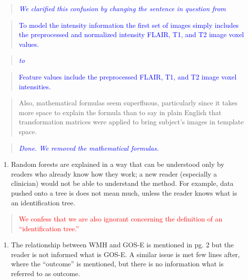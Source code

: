 \documentclass[12pt,]{article}
\providecommand{\tightlist}{%
  \setlength{\itemsep}{0pt}\setlength{\parskip}{0pt}}
\begin{document}
\begin{quote}
\emph{\textcolor{blue}{We clarified this confusion by changing the sentence in question from}}
\end{quote}

\begin{quote}
\textcolor{blue}{To model the intensity information the first set of images simply includes the
preprocessed and normalized intensity FLAIR, T1, and T2 image voxel values.}
\end{quote}

\begin{quote}
\emph{\textcolor{blue}{to}}
\end{quote}

\begin{quote}
\textcolor{blue}{Feature values include the preprocessed FLAIR, T1, and T2 image voxel intensities.}
\end{quote}

\begin{quote}
Also, mathematical formulas seem superfluous, particularly since it
takes more space to explain the formula than to say in plain English
that transformation matrices were applied to bring subject's images in
template space.
\end{quote}

\begin{quote}
\emph{\textcolor{blue}{Done.  We removed the mathematical formulas.}}
\end{quote}

\begin{enumerate}
\def\labelenumi{\arabic{enumi}.}
\setcounter{enumi}{6}
\tightlist
\item
  Random forests are explained in a way that can be understood only by
  readers who already know how they work; a new reader (especially a
  clinician) would not be able to understand the method. For example,
  data pushed onto a tree is does not mean much, unless the reader knows
  what is an identification tree.
\end{enumerate}

\begin{quote}
\textcolor{red}{We confess that we are also ignorant concerning the
definition of an ``identification tree.''}
\end{quote}

\begin{enumerate}
\def\labelenumi{\arabic{enumi}.}
\setcounter{enumi}{7}
\tightlist
\item
  The relationship between WMH and GOS-E is mentioned in pg. 2 but the
  reader is not informed what is GOS-E. A similar issue is met few lines
  after, where the ``outcome'' is mentioned, but there is no information
  what is referred to as outcome.
\end{enumerate}
\end{document}
